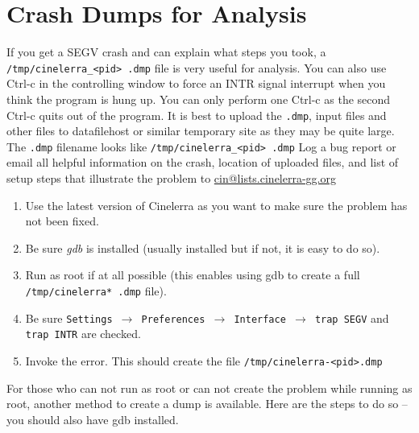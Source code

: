 \section{Crash Dumps for Analysis}%
\label{cha:crash_dumps_analysis}
If you get a SEGV crash and can explain what steps you took, a \texttt{/tmp/cinelerra\_<pid> .dmp} file is
very useful for analysis. You can also use Ctrl-c in the controlling window to force an INTR signal interrupt when
you think the program is hung up. You can only perform one Ctrl-c as the second Ctrl-c quits out of the program. It
is best to upload the \texttt{.dmp}, input files and other files to datafilehost or similar temporary site as they may be quite large. The \texttt{.dmp} filename looks like \texttt{/tmp/cinelerra\_<pid> .dmp} Log a bug report or email all
helpful information on the crash, location of uploaded files, and list of setup steps that illustrate the problem to
{\small \href{mailto:cin@lists.cinelerra-gg.org}{cin@lists.cinelerra-gg.org}}

\begin{enumerate}[nosep]
	\item Use the latest version of Cinelerra as you want to make sure the problem has not been fixed.
	\item Be sure \textit{gdb} is installed (usually installed but if not, it is easy to do so).
    \item Run as root if at all possible (this enables using gdb to create a full \texttt{/tmp/cinelerra* .dmp} file).
    \item Be sure \texttt{Settings $\rightarrow$ Preferences $\rightarrow$ Interface $\rightarrow$ trap SEGV} and \texttt{trap INTR} are checked.
	\item Invoke the error. This should create the file \texttt{/tmp/cinelerra-<pid>.dmp}
\end{enumerate}
\medskip

For those who can not run as root or can not create the problem while running as root, another method to create a dump
is available. Here are the steps to do so -- you should also have gdb installed.
\medskip

